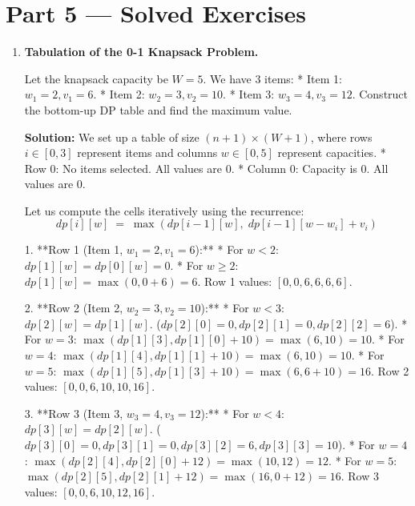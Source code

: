 \documentclass[12pt, a4paper]{book}
\begin{document}
\section{Part 5 --- Solved Exercises}

\begin{problembox}
\begin{enumerate}[label=\textbf{E\arabic*.}]
  \item \textbf{Tabulation of the 0-1 Knapsack Problem.}
  
        Let the knapsack capacity be $W = 5$. We have 3 items:
        * Item 1: $w_1 = 2, v_1 = 6$.
        * Item 2: $w_2 = 3, v_2 = 10$.
        * Item 3: $w_3 = 4, v_3 = 12$.
        Construct the bottom-up DP table and find the maximum value.
        
        \textbf{Solution:}
        We set up a table of size $(n+1) \times (W+1)$, where rows $i \in [0, 3]$ represent items and columns $w \in [0, 5]$ represent capacities.
        * Row 0: No items selected. All values are 0.
        * Column 0: Capacity is 0. All values are 0.
        
        Let us compute the cells iteratively using the recurrence:
        \[
          dp[i][w] \;=\; \max\left( dp[i-1][w], \; dp[i-1][w-w_i] + v_i \right)
        \]
        
        1. **Row 1 (Item 1, $w_1=2, v_1=6$):**
           * For $w < 2$: $dp[1][w] = dp[0][w] = 0$.
           * For $w \ge 2$: $dp[1][w] = \max(0, 0 + 6) = 6$.
           Row 1 values: $[0, 0, 6, 6, 6, 6]$.
           
        2. **Row 2 (Item 2, $w_2=3, v_2=10$):**
           * For $w < 3$: $dp[2][w] = dp[1][w]$. ($dp[2][0]=0, dp[2][1]=0, dp[2][2]=6$).
           * For $w = 3$: $\max(dp[1][3], dp[1][0] + 10) = \max(6, 10) = 10$.
           * For $w = 4$: $\max(dp[1][4], dp[1][1] + 10) = \max(6, 10) = 10$.
           * For $w = 5$: $\max(dp[1][5], dp[1][3] + 10) = \max(6, 6 + 10) = 16$.
           Row 2 values: $[0, 0, 6, 10, 10, 16]$.
           
        3. **Row 3 (Item 3, $w_3=4, v_3=12$):**
           * For $w < 4$: $dp[3][w] = dp[2][w]$. ($dp[3][0]=0, dp[3][1]=0, dp[3][2]=6, dp[3][3]=10$).
           * For $w = 4$: $\max(dp[2][4], dp[2][0] + 12) = \max(10, 12) = 12$.
           * For $w = 5$: $\max(dp[2][5], dp[2][1] + 12) = \max(16, 0 + 12) = 16$.
           Row 3 values: $[0, 0, 6, 10, 12, 16]$.
           

\end{enumerate}
\end{problembox}
\end{document}
